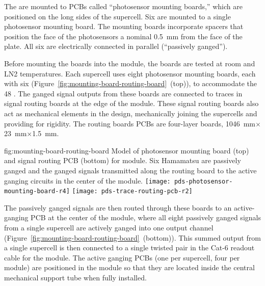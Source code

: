 The  are mounted to PCBs called ``photosensor mounting boards,'' which are positioned on the long sides of the supercell.  
Six  are mounted to a single photosensor mounting board.  The mounting boards incorporate spacers that position the face of the photosensors a nominal \SI{0.5}{mm} from the face of the  plate.  All six are electrically connected in parallel (``passively ganged'').

 Before mounting the boards into the  module, the boards are tested at room and LN2 temperatures. 
 Each supercell uses eight photosensor mounting boards, each with six  (Figure~\ref{fig:mounting-board-routing-board}~(top)), 
 to accommodate the 48 .  The ganged signal outputs from these boards are connected to traces in signal routing boards at the edge of the  module. These signal routing boards also act as mechanical elements in the design, mechanically joining the supercells and providing for rigidity.  The routing boards PCBs are four-layer boards, \SI{1046}{mm}$\times$\SI{23}{mm}$\times$\SI{1.5}{mm}.

\begin{dunefigure}
 {fig:mounting-board-routing-board}
{Model of photosensor mounting board (top) and signal routing PCB (bottom) for  module.  Six Hamamatsu  are passively ganged and the ganged signals transmitted along the routing board to the active ganging circuits in the center of the module.}
\texttt{[image: pds-photosensor-mounting-board-r4]}
\texttt{[image: pds-trace-routing-pcb-r2]}
\end{dunefigure}
The passively ganged signals are then routed through these boards to an active-ganging PCB at the center of the module, where all eight passively ganged signals from a single supercell are actively ganged into one output channel (Figure~\ref{fig:mounting-board-routing-board}~(bottom)). This summed output from a single supercell is then connected to a single twisted pair in the Cat-6 readout cable for the module.  The active ganging PCBs (one per supercell, four per module) are positioned in the module so that they are located inside the central  mechanical support tube when fully installed.


